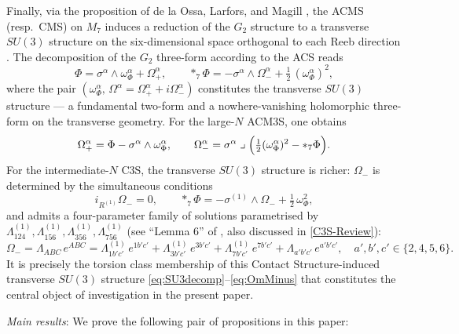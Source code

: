 \documentclass[a4paper,11pt,fleqn]{article}
\theoremstyle{plain}
\theoremstyle{definition}
\begin{document}
Finally, via the proposition of de la Ossa, Larfors, and Magill \cite{Ossa2013},
the ACMS (resp.\ CMS) on $M_7$ induces a reduction of the $G_2$ structure to a transverse
$SU(3)$ structure on the six-dimensional space orthogonal to each Reeb direction
\cite{Friedrich:1997,Arikan:2011zm}. The decomposition of the $G_2$ three-form according
to the ACS reads
\begin{equation}
\Phi = \sigma^\alpha \wedge \omega^\alpha_\Phi + \Omega^\alpha_+,
\qquad
{*}_7\Phi = -\sigma^\alpha \wedge \Omega^\alpha_-
          + \tfrac{1}{2}\,(\omega^\alpha_\Phi)^2,
\label{eq:SU3decomp}
\end{equation}
where the pair $(\omega^\alpha_\Phi,\,\Omega^\alpha = \Omega^\alpha_+ + i\Omega^\alpha_-)$
constitutes the transverse $SU(3)$ structure --- a fundamental two-form and a
nowhere-vanishing holomorphic three-form on the transverse geometry. For the large-$N$
ACM3S, one obtains
\begin{equation}
\Omega^\alpha_+ = \Phi - \sigma^\alpha \wedge \omega^\alpha_\Phi,
\qquad
\Omega^\alpha_- = \sigma^\alpha \;\lrcorner\;
  \Bigl(\tfrac{1}{2}(\omega^\alpha_\Phi)^2 - {*}_7\Phi\Bigr).
\end{equation}
For the intermediate-$N$ C3S, the transverse $SU(3)$ structure is richer: $\Omega_-$ is
determined by the simultaneous conditions
\begin{equation}
i_{R^{(1)}}\Omega_- = 0,
\qquad
{*}_7\Phi = -\sigma^{(1)} \wedge \Omega_- + \tfrac{1}{2}\,\omega^2_\Phi,
\label{eq:OmMinusCond}
\end{equation}
and admits a four-parameter family of solutions parametrised by $\Lambda^{(1)}_{124}, \Lambda^{(1)}_{156}, \Lambda^{(1)}_{356}, \Lambda^{(1)}_{756}$ (see ``Lemma 6'' of \cite{ACMS}, also discussed in \ref{C3S-Review}):
\begin{equation}
\Omega_- = \Lambda_{ABC}\,e^{ABC}
= \Lambda^{(1)}_{1b'c'}\,e^{1b'c'}
+ \Lambda^{(1)}_{3b'c'}\,e^{3b'c'}
+ \Lambda^{(1)}_{7b'c'}\,e^{7b'c'}
+ \Lambda_{a'b'c'}\,e^{a'b'c'},
\quad a',b',c' \in \{2,4,5,6\}.
\label{eq:OmMinus}
\end{equation}
It is precisely the torsion class membership of this Contact Structure-induced transverse
$SU(3)$ structure \eqref{eq:SU3decomp}--\eqref{eq:OmMinus} that constitutes the central
object of investigation in the present paper.



{\it Main results}: We prove the following pair of propositions in this paper:
\end{document}
